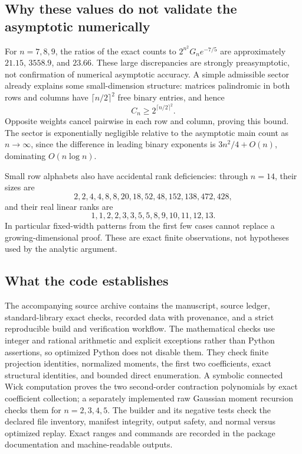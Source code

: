\documentclass[11pt]{article}
\theoremstyle{definition}\newtheorem{definition}[theorem]{Definition}
\theoremstyle{remark}\newtheorem{remark}[theorem]{Remark}
\begin{document}
\subsection{Why these values do not validate the asymptotic numerically}
For $n=7,8,9$, the ratios of the exact counts to $2^{n^2}G_ne^{-7/5}$ are
approximately $21.15$, $3558.9$, and $23.66$. These large discrepancies are
strongly preasymptotic, not confirmation of numerical asymptotic accuracy.
A simple admissible sector already explains some small-dimension structure:
matrices palindromic in both rows and columns have
$\lceil n/2\rceil^2$ free binary entries, and hence
\begin{equation}\label{zsm:eq:palindromic}
 C_n\ge2^{\lceil n/2\rceil^2}.
\end{equation}
Opposite weights cancel pairwise in each row and column, proving this bound.
The sector is exponentially negligible relative to the asymptotic main count
as $n\to\infty$, since the difference in leading binary exponents is
$3n^2/4+O(n)$, dominating $O(n\log n)$.

Small row alphabets also have accidental rank deficiencies: through $n=14$,
their sizes are
\[
 2,2,4,4,8,8,20,18,52,48,152,138,472,428,
\]
and their real linear ranks are
\[
 1,1,2,2,3,3,5,5,8,9,10,11,12,13.
\]
In particular fixed-width patterns from the first few cases cannot replace a
growing-dimensional proof. These are exact finite observations, not hypotheses
used by the analytic argument.

\subsection{What the code establishes}
The accompanying source archive contains the manuscript, source ledger,
standard-library exact checks, recorded data with provenance, and a strict
reproducible build and verification workflow. The mathematical checks use
integer and rational arithmetic and explicit exceptions rather than Python
assertions, so optimized Python does not disable them. They check finite
projection identities, normalized moments, the first two coefficients, exact
structural identities, and bounded direct enumeration. A symbolic connected
Wick computation proves the two second-order contraction polynomials by exact
coefficient collection; a separately implemented raw Gaussian moment recursion
checks them for $n=2,3,4,5$. The builder and its
negative tests check the declared file inventory, manifest integrity, output
safety, and normal versus optimized replay. Exact ranges and commands are
recorded in the package documentation and machine-readable outputs.
\end{document}

